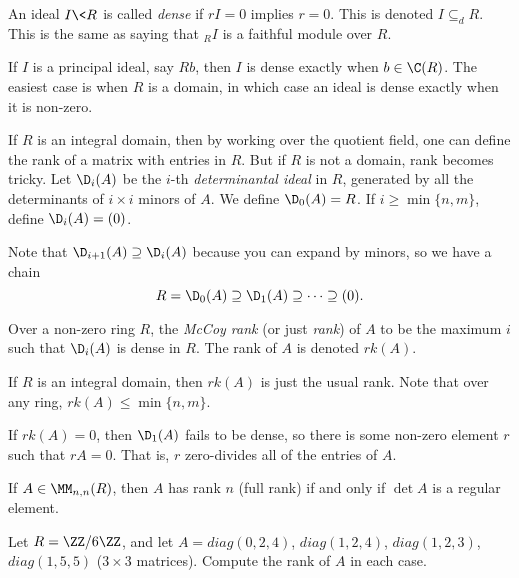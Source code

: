  \setcounter{lecture}{1}


  \begin{definition}
   An ideal $I\< R$ is called \emph{dense} if $rI=0$ implies $r=0$.
   This is denoted $I\subseteq_d R$. This is the same as saying that ${}_RI$ is a
   faithful module over $R$.
 \end{definition}
 If $I$ is a principal ideal, say $Rb$, then $I$ is dense exactly when $b\in \C(R)$. The
 easiest case is when $R$ is a domain, in which case an ideal is dense exactly when it is
 non-zero.

 If $R$ is an integral domain, then by working over the quotient field, one can define
 the rank of a matrix with entries in $R$. But if $R$ is not a domain, rank becomes
 tricky. Let $\D_i(A)$ be the $i$-th \emph{determinantal ideal} in $R$, generated by all
 the determinants of $i\times i$ minors of $A$. We define $\D_0(A)=R$. If $i\ge
 \min\{n,m\}$, define $\D_i(A)=(0)$.

 Note that $\D_{i+1}(A)\supseteq \D_i(A)$ because you can expand by minors, so we have a
 chain
 \[
    R=\D_0(A)\supseteq \D_1(A)\supseteq \cdots \supseteq (0).
 \]
 \begin{definition}
   Over a non-zero ring $R$, the \emph{McCoy rank} (or just \emph{rank}) of $A$ to be
   the maximum $i$ such that $\D_i(A)$ is dense in $R$. The rank of $A$ is denoted
   $rk(A)$.
 \end{definition}
 If $R$ is an integral domain, then $rk(A)$ is just the usual rank. Note that over any
 ring, $rk(A)\le \min\{n,m\}$.

 If $rk(A)=0$, then $\D_1(A)$ fails to be dense, so there is some non-zero element $r$
 such that $rA=0$. That is, $r$ zero-divides all of the entries of $A$.

 If $A\in \MM_{n,n}(R)$, then $A$ has rank $n$ (full rank) if and only if $\det A$ is a
 regular element.

 \begin{exercise}
   Let $R=\ZZ/6\ZZ $, and let $A=diag(0,2,4)$, $diag(1,2,4)$, $diag(1,2,3)$, $diag(1,5,5)$
   ($3\times 3$ matrices). Compute the rank of $A$ in each case.
 \end{exercise}
 \begin{solution}
 \end{solution}
 \setcounter{lecture}{2}

